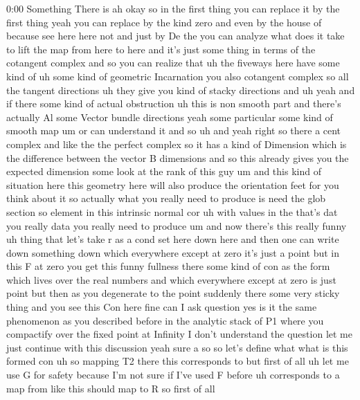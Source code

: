 \begin{unfinished}{0:00}
Something  There  is  ah  okay  so  in  the
first  thing  you  can  replace  it
by  the  first  thing  yeah  you  can  replace
by  the  kind  zero  and  even  by  the  house
of  because  see  here  here  not  and  just  by
De  the  you  can  analyze  what  does  it  take
to  lift  the  map  from  here  to  here  and
it's  just  some  thing  in  terms  of  the
cotangent  complex  and  so  you  can  realize
that
uh  the  fiveways  here  have  some  kind
of
uh  some  kind  of  geometric
Incarnation  you  also  cotangent
complex  so  all  the  tangent  directions  uh
they  give  you  kind  of  stacky  directions
and
uh  yeah  and  if  there  some  kind  of  actual
obstruction  uh  this  is  non  smooth  part
and  there's  actually  Al  some  Vector
bundle
directions
yeah  some  particular  some  kind  of  smooth
map  um  or  can  understand  it  and
so  uh
and  yeah  right  so  there  a  cent  complex
and  like  the  the  perfect  complex  so  it
has  a  kind  of  Dimension  which  is  the
difference  between  the  vector  B
dimensions  and  so  this  already  gives  you
the  expected  dimension
some  look  at  the  rank  of  this
guy  um  and  this  kind  of  situation  here
this  geometry  here  will  also  produce  the
orientation  feet  for  you  think  about  it
so  actually  what  you  really  need  to
produce
is  need  the  glob
section  so
element  in  this  intrinsic  normal
cor  uh  with  values  in
the  that's  dat  you  really  data  you
really  need  to  produce
um  and  now  there's  this  really  funny  uh
thing
that  let's  take  r  as  a
cond  set  here  down  here  and  then  one  can
write  down  something  down  which
everywhere  except  at  zero  it's  just  a
point  but  in  this  F  at  zero  you  get  this
funny
fullness
there  some  kind  of  con
as  the
form  which  lives  over  the  real  numbers
and  which  everywhere  except  at  zero  is
just  point  but  then  as  you  degenerate  to
the  point  suddenly  there  some  very
sticky  thing  and  you  see
this  Con
here
fine  can  I  ask  question
yes  is  it  the  same  phenomenon  as  you
described  before  in  the  analytic  stack
of  P1  where  you  compactify  over  the
fixed  point  at
Infinity
I  don't  understand  the  question  let  me
just  continue  with  this  discussion  yeah
sure  a  so  so  let's  define  what  what  is
this  formed
con  uh  so  mapping  T2  there  this
corresponds  to  but  first  of
all  uh  let  me  use  G  for  safety  because
I'm  not  sure  if  I've  used  F  before  uh
corresponds  to  a  map  from  like  this
should  map  to  R  so  first  of  all

\end{unfinished}
